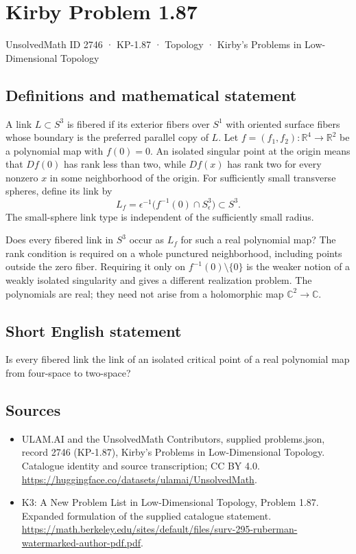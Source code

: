 \documentclass[11pt,a4paper]{article}
\begin{document}
\section*{Kirby Problem 1.87}\label{2746}
{\small UnsolvedMath ID 2746 · KP-1.87 · Topology · Kirby's Problems in Low-Dimensional Topology}
\subsection{Definitions and mathematical statement}
A link $L\subset S^3$ is fibered if its exterior fibers over $S^1$ with oriented
surface fibers whose boundary is the preferred parallel copy of $L$.
Let $f=(f_1,f_2):\mathbb R^4\to\mathbb R^2$ be a polynomial map with $f(0)=0$.
An isolated singular point at the origin means that $Df(0)$ has rank less than
two, while $Df(x)$ has rank two for every nonzero $x$ in some neighborhood of
the origin. For sufficiently small transverse spheres, define its link by
\[
L_f=\epsilon^{-1}\bigl(f^{-1}(0)\cap S^3_\epsilon\bigr)\subset S^3.
\]
The small-sphere link type is independent of the sufficiently small radius.

Does every fibered link in $S^3$ occur as $L_f$ for such a real polynomial map?
The rank condition is required on a whole punctured neighborhood, including
points outside the zero fiber. Requiring it only on
$f^{-1}(0)\setminus\{0\}$ is the weaker notion of a weakly isolated singularity
and gives a different realization problem. The polynomials are real; they need
not arise from a holomorphic map $\mathbb C^2\to\mathbb C$.
\subsection{Short English statement}
Is every fibered link the link of an isolated critical point of a real polynomial map from four-space to two-space?
\subsection{Sources}
\begin{itemize}
\item[S1] ULAM.AI and the UnsolvedMath Contributors, supplied problems.json, record 2746 (KP-1.87), Kirby's Problems in Low-Dimensional Topology. Catalogue identity and source transcription; CC BY 4.0.
\url{https://huggingface.co/datasets/ulamai/UnsolvedMath}.
\item[S2] K3: A New Problem List in Low-Dimensional Topology, Problem 1.87. Expanded formulation of the supplied catalogue statement.
\url{https://math.berkeley.edu/sites/default/files/surv-295-ruberman-watermarked-author-pdf.pdf}.
\end{itemize}
\end{document}
